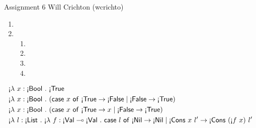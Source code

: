 \documentclass[11pt]{article}
\newcommand{\lfun}[3]{\text{\textexclamdown}\lambda~{#1}:{#2}~.~{#3}}
\newcommand{\lapp}[2]{\text{\textexclamdown}{#1}~{#2}}
\newcommand{\lcase}[2]{\mathsf{case}~{#1}~\mathsf{of}~{#2}}
\newcommand{\ltyprim}[1]{\text{\textexclamdown}\msf{#1}}
\newcommand{\ltyfun}[2]{{#1} \multimap {#2}}
\begin{document}
\hwtitle
  {Assignment 6}
  {Will Crichton (wcrichto)} %


\begin{enumerate}
\item %

\item
  \begin{enumerate} %
    \item
    \item
    \item
    \item
  \end{enumerate}
\end{enumerate}

\begin{align*}
&\lfun{x}{\ltyprim{Bool}}{\ltyprim{True}} \\
&\lfun {x}{\ltyprim{Bool}}{(\lcase{x}{
  \ltyprim{True} \rightarrow \ltyprim{False} \mid \ltyprim{False} \rightarrow \ltyprim{True}})} \\
&\lfun {x}{\ltyprim{Bool}}{(\lcase{x}{
  \ltyprim{True} \rightarrow x \mid \ltyprim{False} \rightarrow \ltyprim{True}})} \\
&\lfun{l}{\ltyprim{List}}{
  \lfun{f}{\ltyfun{\ltyprim{Val}}{\ltyprim{Val}}}
  {\lcase{l}{\ltyprim{Nil} \rightarrow \ltyprim{Nil} \mid \ltyprim{Cons}~x~l' \rightarrow \ltyprim{Cons}~(\lapp{f}{x})~l'}}}
\end{align*}
\end{document}
